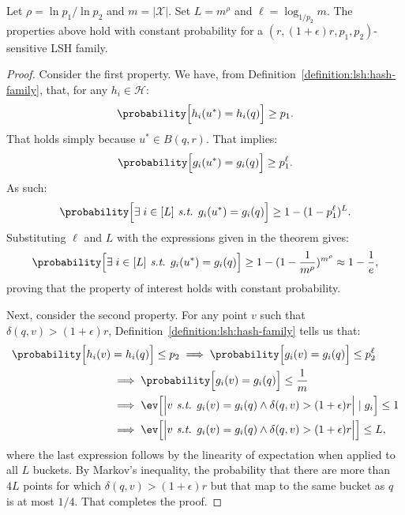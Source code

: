 \begin{theorem}
    \label{theorem:lsh:pleb-configuration}
    Let $\rho=\ln p_1 / \ln p_2$ and $m=\lvert \mathcal{X} \rvert$.
    Set $L=m^\rho$ and $\ell=\log_{1/p_2} m$. The properties above hold
    with constant probability for a $(r, (1+\epsilon)r, p_1, p_2)$-sensitive LSH family.
\end{theorem}
\begin{proof}
    Consider the first property. We have, from Definition~\ref{definition:lsh:hash-family},
    that, for any $h_i \in \mathcal{H}$:
    \begin{equation*}
        \probability\Big[ h_i(u^\ast) = h_i(q) \Big] \geq p_1.
    \end{equation*}
    That holds simply because $u^\ast \in B(q, r)$. That implies:
    \begin{equation*}
        \probability\Big[ g_i(u^\ast) = g_i(q) \Big] \geq p_1^\ell.
    \end{equation*}
    As such:
    \begin{equation*}
        \probability\Big[ \exists \; i \in [L] \textit{ s.t. } g_i(u^\ast) = g_i(q) \Big] \geq 1 - (1 - p_1^\ell)^L.
    \end{equation*}
    Substituting $\ell$ and $L$ with the expressions given in the theorem gives:
    \begin{equation*}
        \probability\Big[ \exists \; i \in [L] \textit{ s.t. } g_i(u^\ast) = g_i(q) \Big] \geq 1 - (1 - \frac{1}{m^\rho})^{m^\rho} \approx 1 - \frac{1}{e},
    \end{equation*}
    proving that the property of interest holds with constant probability.

    Next, consider the second property. For any point $v$ such that $\delta(q, v) > (1 + \epsilon)r$,
    Definition~\ref{definition:lsh:hash-family} tells us that:
    \begin{align*}
        \probability\Big[ h_i(v) &= h_i(q) \Big] \leq p_2 \implies \probability\Big[ g_i(v) = g_i(q) \Big] \leq p_2^\ell \\
        &\implies \probability\Big[ g_i(v) = g_i(q) \Big] \leq \frac{1}{m} \\
        &\implies \ev\Big[ \Big\lvert v \textit{ s.t. } g_i(v) = g_i(q) \land \delta(q, v) > (1 + \epsilon)r \Big\rvert \;|\; g_i \Big] \leq 1 \\
        &\implies \ev\Big[ \Big\lvert v \textit{ s.t. } g_i(v) = g_i(q) \land \delta(q, v) > (1 + \epsilon)r \Big\rvert \Big] \leq L,
    \end{align*}
    where the last expression follows by the linearity of expectation when applied to all $L$ buckets.
    By Markov's inequality, the probability that there are more than $4L$ points for which $\delta(q, v) > (1+\epsilon)r$
    but that map to the same bucket as $q$ is at most $1/4$. That completes the proof.
\end{proof}


